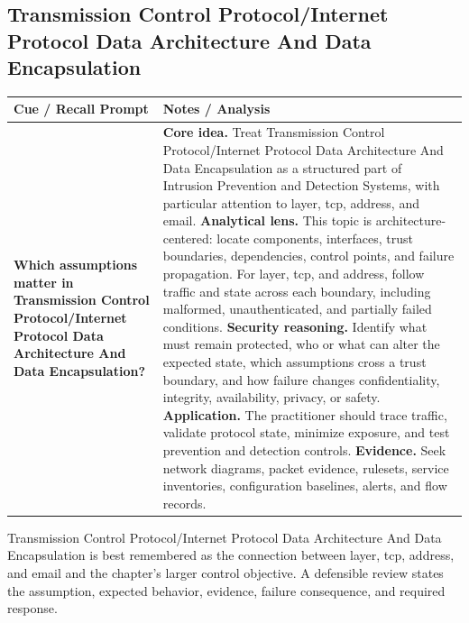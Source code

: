 \documentclass[11pt]{article}
\newcommand{\CornellHeader}{%
\rowcolor{Navy}\color{white}\bfseries Cue / Recall Prompt & \color{white}\bfseries Notes / Analysis\\\hline}
\newcommand{\CornellRow}[2]{%
\cellcolor{CueGray}\RaggedRight\textbf{#1} & \RaggedRight #2\\\hline}
\begin{document}
\subsection*{Transmission Control Protocol/Internet Protocol Data Architecture And Data Encapsulation}
\begin{longtable}{>{\RaggedRight\arraybackslash}p{}|>{\RaggedRight\arraybackslash}p{}}
\CornellHeader
\CornellRow{Which assumptions matter in Transmission Control Protocol/Internet Protocol Data Architecture And Data Encapsulation?}{\textbf{Core idea.} Treat Transmission Control Protocol/Internet Protocol Data Architecture And Data Encapsulation as a structured part of Intrusion Prevention and Detection Systems, with particular attention to layer, tcp, address, and email. \textbf{Analytical lens.} This topic is architecture-centered: locate components, interfaces, trust boundaries, dependencies, control points, and failure propagation. For layer, tcp, and address, follow traffic and state across each boundary, including malformed, unauthenticated, and partially failed conditions. \textbf{Security reasoning.} Identify what must remain protected, who or what can alter the expected state, which assumptions cross a trust boundary, and how failure changes confidentiality, integrity, availability, privacy, or safety. \textbf{Application.} The practitioner should trace traffic, validate protocol state, minimize exposure, and test prevention and detection controls. \textbf{Evidence.} Seek network diagrams, packet evidence, rulesets, service inventories, configuration baselines, alerts, and flow records.}
\end{longtable}
\begin{topicsummary}
Transmission Control Protocol/Internet Protocol Data Architecture And Data Encapsulation is best remembered as the connection between layer, tcp, address, and email and the chapter's larger control objective. A defensible review states the assumption, expected behavior, evidence, failure consequence, and required response.
\end{topicsummary}
\end{document}
